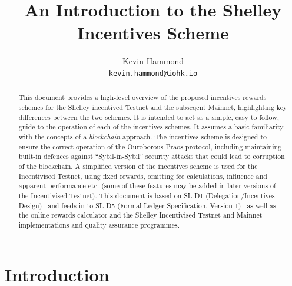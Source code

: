 \documentclass[11pt,a4paper,dvipsnames,twosided,final]{article}
\begin{document}
\renewcommand{\thepage}{\arabic{page}}
\setcounter{page}{1}

\title{An Introduction to the Shelley Incentives Scheme}

\author{Kevin Hammond  \\ {\small \texttt{kevin.hammond@iohk.io}}}

\maketitle

\begin{abstract}
  \noindent
  This document provides a high-level overview of the proposed incentives rewards schemes for
  the Shelley incentived Testnet and the subseqent Mainnet, highlighting key
  differences between the two schemes.  It is intended to act as a
  simple, easy to follow, guide to the operation of each of the incentives schemes.
  It assumes a basic familiarity with the concepts of a \emph{blockchain} approach.
  The incentives scheme is designed to ensure the correct operation of the Ouroborous Praos
  protocol, including maintaining built-in defences against ``Sybil-in-Sybil'' security attacks
  that could lead to corruption of the blockchain.
  A simplified version of the incentives scheme is used for the Incentivised Testnet, using fixed rewards,
  omitting fee calculations, influence and apparent performance etc. (some of these features may be
  added in later versions of the Incentivised Testnet).
  This document is based on SL-D1 (Delegation/Incentives Design)~\cite{delegation_design} and feeds in to SL-D5
  (Formal Ledger Specification. Version 1)~\cite{shelley_spec} as well as the online rewards calculator and the Shelley Incentivised Testnet and Mainnet  implementations and quality assurance programmes.
\end{abstract}

\clearpage
\section{Introduction}
\label{sec:introduction}
\end{document}

